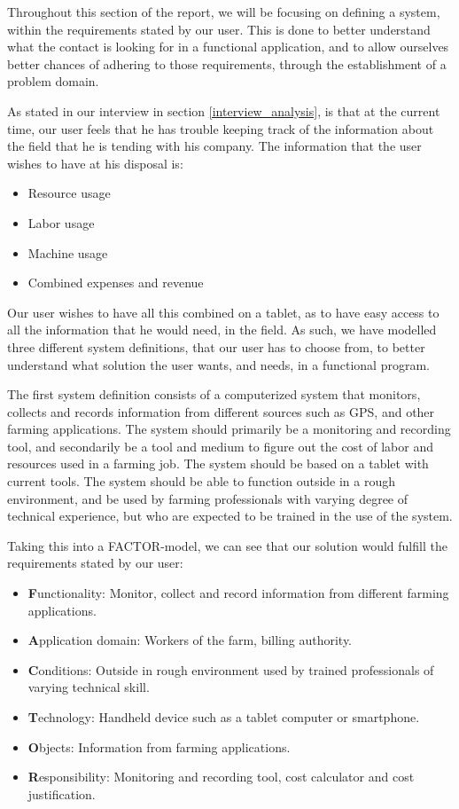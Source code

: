 Throughout this section of the report, we will be focusing on defining a system, within the requirements stated by our user. This is done to better understand what the contact is looking for in a functional application, and to allow ourselves better chances of adhering to those requirements, through the establishment of a problem domain.


As stated in our interview in section \ref{interview_analysis}, is that at the current time, our user feels that he has trouble keeping track of the information about the field that he is tending with his company.
The information that the user wishes to have at his disposal is:

\begin{itemize}
    \item Resource usage
    \item Labor usage
    \item Machine usage
    \item Combined expenses and revenue
\end{itemize}

Our user wishes to have all this combined on a tablet, as to have easy access to all the information that he would need, in the field. As such, we have modelled three different system definitions, that our user has to choose from, to better understand what solution the user wants, and needs, in a functional program.

The first system definition consists of a computerized system that monitors, collects and records information from different sources such as GPS, and other farming applications. The system should primarily be a monitoring and recording tool, and secondarily be a tool and medium to figure out the cost of labor and resources used in a farming job. The system should be based on a tablet with current tools. The system should be able to function outside in a rough environment, and be used by farming professionals with varying degree of technical experience, but who are expected to be trained in the use of the system. 

Taking this into a FACTOR-model, we can see that our solution would fulfill the requirements stated by our user:

\begin{itemize}[noitemsep]
    \item \textbf{F}unctionality: Monitor, collect and record information from different farming applications.
    \item \textbf{A}pplication domain: Workers of the farm, billing authority.
    \item \textbf{C}onditions: Outside in rough environment used by trained professionals of varying technical skill.
    \item \textbf{T}echnology: Handheld device such as a tablet computer or smartphone.
    \item \textbf{O}bjects: Information from farming applications.
    \item \textbf{R}esponsibility: Monitoring and recording tool, cost calculator and cost justification.
\end{itemize}

